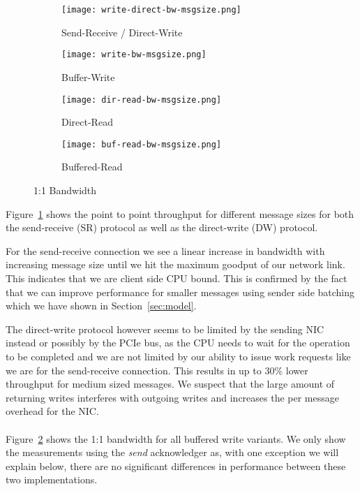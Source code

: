 \begin{figure}[htp]
\begin{subfigure}[b]{0.49\textwidth}
  \centering
  \texttt{[image: write-direct-bw-msgsize.png]}
  \caption{Send-Receive / Direct-Write}
  \label{fig:plot-sr-dw-bw}
\end{subfigure}
\begin{subfigure}[b]{0.49\textwidth}
  \centering
  \texttt{[image: write-bw-msgsize.png]}
  \caption{Buffer-Write}
  \label{fig:plot-bw-bw}
\end{subfigure}
\begin{subfigure}[b]{0.49\textwidth}
  \centering
  \texttt{[image: dir-read-bw-msgsize.png]}
  \caption{Direct-Read}
  \label{fig:plot-dr-bw}
\end{subfigure}
\begin{subfigure}[b]{0.57\textwidth}
  \centering
  \texttt{[image: buf-read-bw-msgsize.png]}
  \caption{Buffered-Read}
  \label{fig:plot-br-bw}
\end{subfigure}
  \caption{1:1 Bandwidth}
  \label{fig:plot-bw}
\end{figure}

Figure~\ref{fig:plot-sr-dw-bw} shows the point to point throughput for different message sizes for both the send-receive (SR)
protocol as well as the direct-write (DW) protocol. 

For the send-receive connection we see a linear increase in bandwidth with increasing message size until we hit the
maximum goodput of our network link. This indicates that we are client side CPU bound. This is confirmed by the fact that we can
improve performance for smaller messages using sender side batching which we have shown in Section~\ref{sec:model}.

The direct-write protocol however seems to be limited by the sending NIC instead or possibly by the PCIe bus, as the CPU needs
to wait for the operation to be completed and we are not limited by our ability to issue work requests like we are for the 
send-receive connection. This results in up to 30\% lower throughput for medium sized messages. We suspect that the large 
amount of returning writes interferes with outgoing writes and increases the per message overhead for the NIC. 


\paragraph{} Figure~\ref{fig:plot-bw-bw} shows the 1:1 bandwidth for all buffered write variants. We only show the measurements
using the \emph{send} acknowledger as, with one exception we will explain below, there are no significant differences
in performance between these two implementations.

